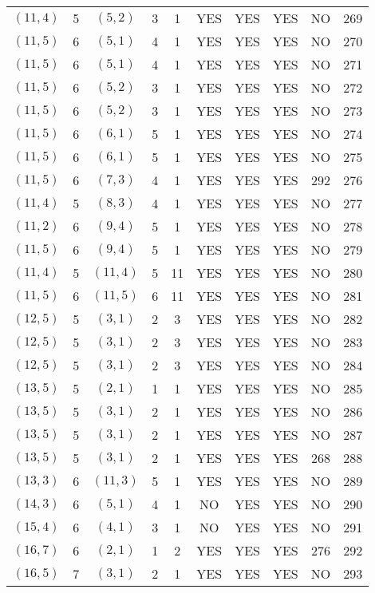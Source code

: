 \begin{longtable}{|c|c|c|c|c|c|c|c|c|c|}
$(11, 4)$ & 5 & $(5, 2)$ & 3 & 1 & YES & YES & YES & NO & 269\\
$(11, 5)$ & 6 & $(5, 1)$ & 4 & 1 & YES & YES & YES & NO & 270\\
$(11, 5)$ & 6 & $(5, 1)$ & 4 & 1 & YES & YES & YES & NO & 271\\
$(11, 5)$ & 6 & $(5, 2)$ & 3 & 1 & YES & YES & YES & NO & 272\\
$(11, 5)$ & 6 & $(5, 2)$ & 3 & 1 & YES & YES & YES & NO & 273\\
$(11, 5)$ & 6 & $(6, 1)$ & 5 & 1 & YES & YES & YES & NO & 274\\
$(11, 5)$ & 6 & $(6, 1)$ & 5 & 1 & YES & YES & YES & NO & 275\\
$(11, 5)$ & 6 & $(7, 3)$ & 4 & 1 & YES & YES & YES & 292 & 276\\
$(11, 4)$ & 5 & $(8, 3)$ & 4 & 1 & YES & YES & YES & NO & 277\\
$(11, 2)$ & 6 & $(9, 4)$ & 5 & 1 & YES & YES & YES & NO & 278\\
$(11, 5)$ & 6 & $(9, 4)$ & 5 & 1 & YES & YES & YES & NO & 279\\
$(11, 4)$ & 5 & $(11, 4)$ & 5 & 11 & YES & YES & YES & NO & 280\\
$(11, 5)$ & 6 & $(11, 5)$ & 6 & 11 & YES & YES & YES & NO & 281\\
$(12, 5)$ & 5 & $(3, 1)$ & 2 & 3 & YES & YES & YES & NO & 282\\
$(12, 5)$ & 5 & $(3, 1)$ & 2 & 3 & YES & YES & YES & NO & 283\\
$(12, 5)$ & 5 & $(3, 1)$ & 2 & 3 & YES & YES & YES & NO & 284\\
$(13, 5)$ & 5 & $(2, 1)$ & 1 & 1 & YES & YES & YES & NO & 285\\
$(13, 5)$ & 5 & $(3, 1)$ & 2 & 1 & YES & YES & YES & NO & 286\\
$(13, 5)$ & 5 & $(3, 1)$ & 2 & 1 & YES & YES & YES & NO & 287\\
$(13, 5)$ & 5 & $(3, 1)$ & 2 & 1 & YES & YES & YES & 268 & 288\\
$(13, 3)$ & 6 & $(11, 3)$ & 5 & 1 & YES & YES & YES & NO & 289\\
$(14, 3)$ & 6 & $(5, 1)$ & 4 & 1 & NO & YES & YES & NO & 290\\
$(15, 4)$ & 6 & $(4, 1)$ & 3 & 1 & NO & YES & YES & NO & 291\\
$(16, 7)$ & 6 & $(2, 1)$ & 1 & 2 & YES & YES & YES & 276 & 292\\
$(16, 5)$ & 7 & $(3, 1)$ & 2 & 1 & YES & YES & YES & NO & 293\\

\end{longtable}
